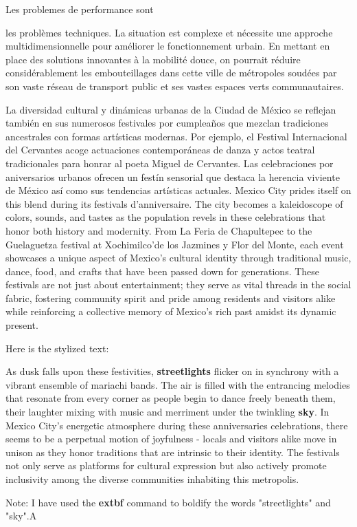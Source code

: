 \documentclass[12pt, a4paper]{article}
\begin{document}
Les problemes de performance sont 

les problèmes techniques. La situation est complexe et nécessite une approche multidimensionnelle pour améliorer le fonctionnement urbain. En mettant en place des solutions innovantes à la mobilité douce, on pourrait réduire considérablement les embouteillages dans cette ville de métropoles soudées par son vaste réseau de transport public et ses vastes espaces verts communautaires.


La diversidad cultural y dinámicas urbanas de la Ciudad de México se reflejan también en sus numerosos festivales por cumpleaños que mezclan tradiciones ancestrales con formas artísticas modernas. Por ejemplo, el Festival Internacional del Cervantes acoge actuaciones contemporáneas de danza y actos teatral tradicionales para honrar al poeta Miguel de Cervantes. Las celebraciones por aniversarios urbanos ofrecen un festín sensorial que destaca la herencia viviente de México así como sus tendencias artísticas actuales.
Mexico City prides itself on this blend during its festivals d’anniversaire. The city becomes a kaleidoscope of colors, sounds, and tastes as the population revels in these celebrations that honor both history and modernity. From La Feria de Chapultepec to the Guelaguetza festival at Xochimilco'de los Jazmines y Flor del Monte, each event showcases a unique aspect of Mexico’s cultural identity through traditional music, dance, food, and crafts that have been passed down for generations. These festivals are not just about entertainment; they serve as vital threads in the social fabric, fostering community spirit and pride among residents and visitors alike while reinforcing a collective memory of Mexico’s rich past amidst its dynamic present.

Here is the stylized text:

As dusk falls upon these festivities, \textbf{streetlights} flicker on in synchrony with a vibrant ensemble of mariachi bands. The air is filled with the entrancing melodies that resonate from every corner as people begin to dance freely beneath them, their laughter mixing with music and merriment under the twinkling \textbf{sky}. In Mexico City's energetic atmosphere during these anniversaries celebrations, there seems to be a perpetual motion of joyfulness - locals and visitors alike move in unison as they honor traditions that are intrinsic to their identity. The festivals not only serve as platforms for cultural expression but also actively promote inclusivity among the diverse communities inhabiting this metropolis.

Note: I have used the \textbf{extbf} command to boldify the words "streetlights" and "sky".A

  
\end{document}
